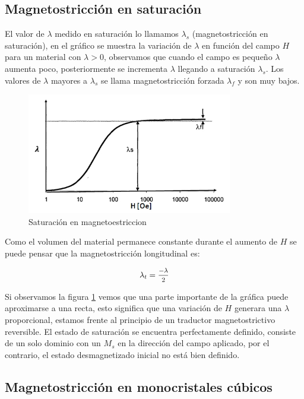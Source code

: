 \subsection{Magnetostricción en saturación}

El valor de $\lambda$ medido en saturación lo llamamos $\lambda_{s}$ (magnetostricción en saturación), en el gráfico se muestra la variación de $\lambda$ en función del campo $H$ para un material con $\lambda> 0$, observamos que cuando el campo es pequeño $\lambda$ aumenta poco, posteriormente se incrementa $\lambda$ llegando a saturación $\lambda_{s}$. Los valores de $\lambda$ mayores a $\lambda_{s}$ se llama magnetostricción forzada $\lambda_{f}$ y son muy bajos.

\begin{figure}[H]
    \centering
    \includegraphics[width=0.8\textwidth]{./Figures/magnetoestriccion}
	\caption{Saturación en magnetoestriccion}
	\label{fig:magnetoestriccion_2}
\end{figure}

Como el volumen del material permanece constante durante el aumento de $H$ se puede pensar que la magnetostricción longitudinal es:

\begin{equation}
	\lambda_{t} = \mfrac{-\lambda}{2}
\end{equation}

Si observamos la figura \ref{fig:magnetoestriccion_2} vemos que una parte importante de la gráfica puede aproximarse a una recta, esto significa que una variación de $H$ generara una $\lambda$ proporcional, estamos frente al principio de un traductor magnetostrictivo reversible. El estado de saturación se encuentra perfectamente definido, consiste de un solo dominio con un $M_{s}$ en la dirección del campo aplicado, por el contrario, el estado desmagnetizado inicial no está bien definido.

\subsection{Magnetostricción en monocristales cúbicos}


